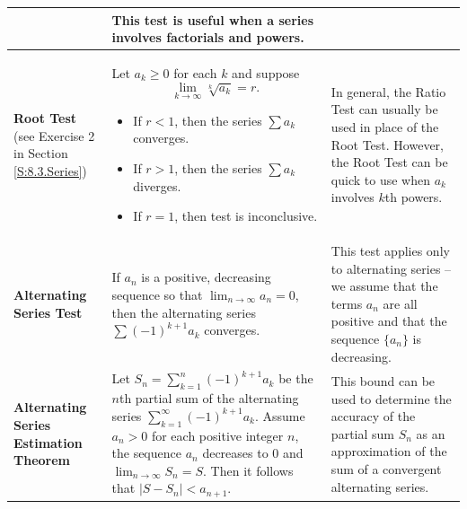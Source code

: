 \begin{center}
\begin{tabular}{p{0.75in}|p{2.5in}|p{1.5in}}
&This test is useful when a series involves factorials and powers. \\ \hline
 \vphantom{\Large{M}} \textbf{Root Test} (see Exercise 2 in Section \ref{S:8.3.Series}) & Let $a_k \geq 0$ for each $k$ and suppose
\[\displaystyle \lim_{k \to \infty} \sqrt[k]{a_k} = r.\]
	\begin{itemize}
	\item If $r < 1$, then the series $\sum a_k$ converges.
	\item If $r > 1$, then the series $\sum a_k$ diverges.
	\item If $r=1$, then test is inconclusive.
	\end{itemize}
&In general, the Ratio Test can usually be used in place of the Root Test. However, the Root Test can be quick to use when $a_k$ involves $k$th powers. \\ \hline
 \vphantom{\Large{M}} \textbf{Alternating Series Test} &If $a_n$ is a positive, decreasing sequence so that $\displaystyle \lim_{n \to \infty} a_n = 0$, then the alternating series $\sum (-1)^{k+1} a_k$ converges. &This test applies only to alternating series -- we assume that the terms $a_n$ are all positive and that the sequence $\{a_n\}$ is decreasing. \\ \hline
 \vphantom{\Large{M}} \textbf{Alternating Series Estimation Theorem} &Let $S_n = \displaystyle \sum_{k=1}^n (-1)^{k+1} a_k$ be the $n$th partial sum of the alternating series $\displaystyle \sum_{k=1}^{\infty} (-1)^{k+1} a_k$. Assume $a_n > 0$ for each positive integer $n$, the sequence $a_n$ decreases to 0 and $\displaystyle \lim_{n \to \infty} S_n = S$. Then it follows that
$|S - S_n| < a_{n+1}.$
&This bound can be used to determine the accuracy of the partial sum $S_n$ as an approximation of the sum of a convergent alternating series. \\ \hline
\end{tabular}
\end{center}
\endgroup




\vfill \
\newpage

